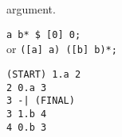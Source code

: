 argument.
\begin{center}\begin{minipage}[t]{3in}\begin{minipage}[t]{3in}\begin{tabbing}
\qquad \= \verb#a b* $ [0] 0;#\\
or \> \verb#([a] a) ([b] b)*;#
\end{tabbing}\end{minipage}\end{minipage}
\begin{minipage}[t]{1.6in}\begin{verbatim}
(START) 1.a 2
2 0.a 3
3 -| (FINAL)
3 1.b 4
4 0.b 3
\end{verbatim}\end{minipage}\end{center}

